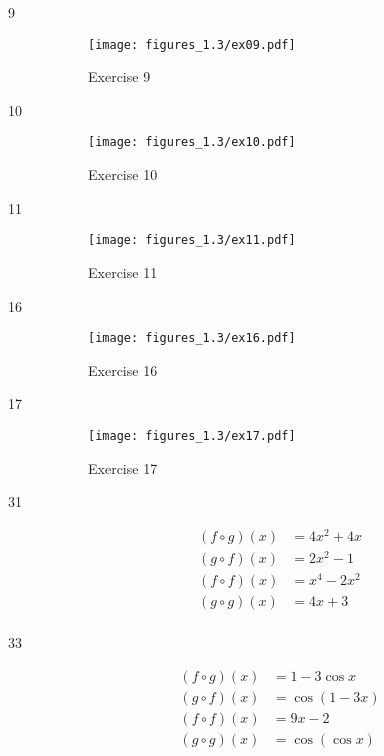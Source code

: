 \documentclass[letterpaper, landscape]{exam}
\begin{document}
\begin{description}
      \item[9] 
        \begin{figure}[H]
          \centering
          \texttt{[image: figures\_1.3/ex09.pdf]}
          \caption{Exercise 9}
          \label{fig:ex09}
        \end{figure}

      \item[10] 
        \begin{figure}[H]
          \centering
          \texttt{[image: figures\_1.3/ex10.pdf]}
          \caption{Exercise 10}
          \label{fig:ex10}
        \end{figure}

      \item[11] 
        \begin{figure}[H]
          \centering
          \texttt{[image: figures\_1.3/ex11.pdf]}
          \caption{Exercise 11}
          \label{fig:ex11}
        \end{figure}

      \item[16] 
        \begin{figure}[H]
          \centering
          \texttt{[image: figures\_1.3/ex16.pdf]}
          \caption{Exercise 16}
          \label{fig:ex16}
        \end{figure}

      \item[17] 
        \begin{figure}[H]
          \centering
          \texttt{[image: figures\_1.3/ex17.pdf]}
          \caption{Exercise 17}
          \label{fig:ex17}
        \end{figure}

      \item[31]
        \begin{align*}
          (f \circ g)(x) &= 4x^2 + 4x \\
          (g \circ f)(x) &= 2x^2 - 1 \\
          (f \circ f)(x) &= x^4 - 2x^2 \\
          (g \circ g)(x) &= 4x + 3 \\
        \end{align*}

      \item[33]
        \begin{align*}
          (f \circ g)(x) &= 1 - 3 \cos{x} \\
          (g \circ f)(x) &= \cos{ (1 - 3x) } \\
          (f \circ f)(x) &= 9x - 2 \\
          (g \circ g)(x) &= \cos { (\cos { x }) } \\
        \end{align*}


\end{description}
\end{document}
